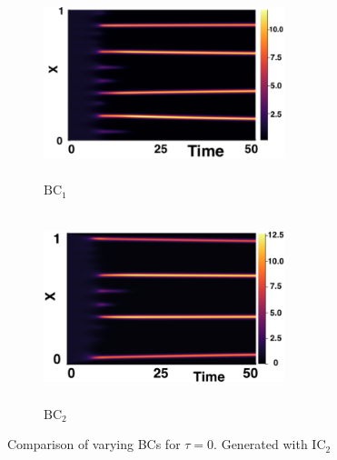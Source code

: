 \documentclass[12pt]{report}
\begin{document}
\begin{figure}[H]
    \centering
    \begin{subfigure}[b]{0.45\textwidth}
        \centering
        \includegraphics[width=7cm,height=5.5cm]{ic20.png}
        \caption{$\text{BC}_1$}
        \label{}
    \end{subfigure}
    \hfill
    \begin{subfigure}[b]{0.45\textwidth}
        \centering
        \includegraphics[width=7cm,height=5.5cm]{bc0.png}
        \caption{$\text{BC}_2$}
        \label{}
    \end{subfigure}
    \caption{Comparison of varying BCs for $\tau=0$. Generated with $\text{IC}_2$}
    \label{fig:bctau1}
\end{figure}
\end{document}
